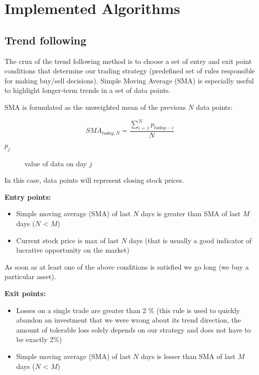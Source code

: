\chapter{Implemented Algorithms}
\label{cha:implementedAlgorithms}



\section{Trend following}
\label{trend_following_impl}

The crux of the trend following method is to choose a set of entry and exit point conditions that determine our trading strategy (predefined set of rules 
responsible for making buy/sell decisions).
Simple Moving Average (SMA) is especially useful to highlight longer-term trends in a set of data points.

SMA is formulated as the unweighted mean of the previous $N$ data points:

\begin{equation}
    SMA_{today,N} = \frac{\sum_{i=1}^{N}p_{today - i}}{N}
\end{equation}

\begin{description}
  \item [$p_{j}$] 
    value of data on day $j$
\end{description}

In this case, data points will represent closing stock prices. 
 


\textbf{Entry points:}
  \begin{itemize}
    \item Simple moving average (SMA) of last $N$ days is greater than SMA of last $M$ days ($N$ < $M$)
    \item Current stock price is max of last $N$ days (that is usually a good indicator of lucrative opportunity on the market)
  \end{itemize}

As soon as at least one of the above conditions is satisfied we go long (we buy a particular asset).


\textbf{Exit points:}
  \begin{itemize}
    \item Losses on a single trade are greater than 2 \% (this rule is used to quickly abandon an investment that we were wrong about its trend direction,
	  the amount of tolerable loss solely depends on our strategy and does not have to be exactly 2\%)
    \item Simple moving average (SMA) of last $N$ days is lesser than SMA of last $M$ days ($N$ < $M$)
  \end{itemize}

